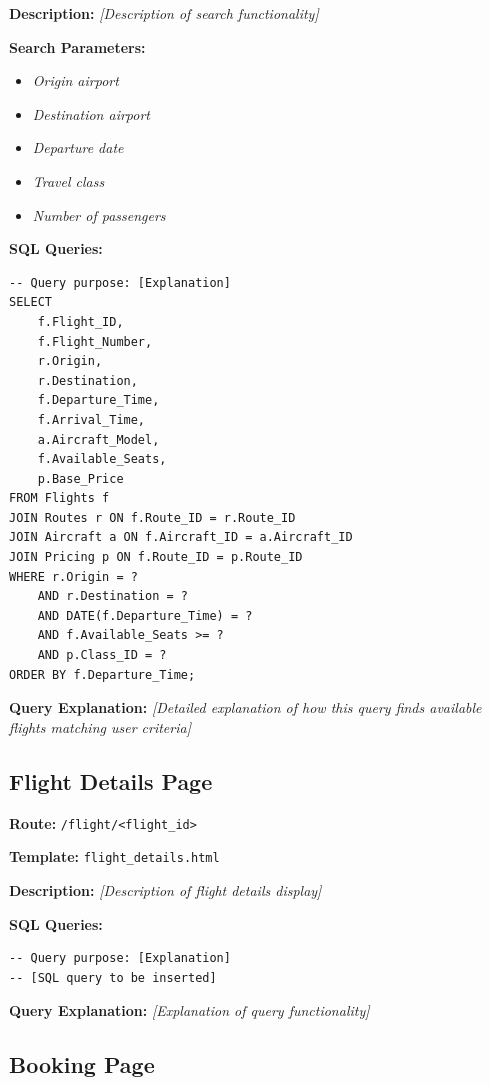 \documentclass[12pt,a4paper,openany]{report}
\begin{document}
\textbf{Description:}
\textit{[Description of search functionality]}

\textbf{Search Parameters:}
\begin{itemize}
    \item \textit{Origin airport}
    \item \textit{Destination airport}
    \item \textit{Departure date}
    \item \textit{Travel class}
    \item \textit{Number of passengers}
\end{itemize}

\textbf{SQL Queries:}

\begin{lstlisting}[caption={Flight Search - Available Flights Query}]
-- Query purpose: [Explanation]
SELECT 
    f.Flight_ID,
    f.Flight_Number,
    r.Origin,
    r.Destination,
    f.Departure_Time,
    f.Arrival_Time,
    a.Aircraft_Model,
    f.Available_Seats,
    p.Base_Price
FROM Flights f
JOIN Routes r ON f.Route_ID = r.Route_ID
JOIN Aircraft a ON f.Aircraft_ID = a.Aircraft_ID
JOIN Pricing p ON f.Route_ID = p.Route_ID
WHERE r.Origin = ? 
    AND r.Destination = ?
    AND DATE(f.Departure_Time) = ?
    AND f.Available_Seats >= ?
    AND p.Class_ID = ?
ORDER BY f.Departure_Time;
\end{lstlisting}

\textbf{Query Explanation:}
\textit{[Detailed explanation of how this query finds available flights matching user criteria]}

\subsection{Flight Details Page}

\textbf{Route:} \texttt{/flight/<flight\_id>}

\textbf{Template:} \texttt{flight\_details.html}

\textbf{Description:}
\textit{[Description of flight details display]}

\textbf{SQL Queries:}

\begin{lstlisting}[caption={Flight Details Query}]
-- Query purpose: [Explanation]
-- [SQL query to be inserted]
\end{lstlisting}

\textbf{Query Explanation:}
\textit{[Explanation of query functionality]}

\subsection{Booking Page}
\end{document}
